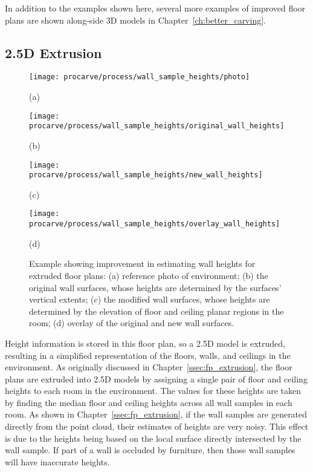 \documentclass[12pt,onecolumn,oneside]{book}
\begin{document}
In addition to the examples shown here, several more examples of improved floor plans are shown along-side 3D models in Chapter~\ref{ch:better_carving}.

\subsection{2.5D Extrusion}
\label{ssec:octree_fp_extrusion}

\begin{figure}

	\centering
	\begin{minipage}[t]{0.45\linewidth}
		\centerline{\texttt{[image: procarve/process/wall\_sample\_heights/photo]}}
		\centerline{(a)}
	\end{minipage}
	\hfill
	\begin{minipage}[t]{0.45\linewidth}
		\centerline{\texttt{[image: procarve/process/wall\_sample\_heights/original\_wall\_heights]}}
		\centerline{(b)}
	\end{minipage}
	
	\begin{minipage}[t]{0.45\linewidth}
		\centerline{\texttt{[image: procarve/process/wall\_sample\_heights/new\_wall\_heights]}}
		\centerline{(c)}
	\end{minipage}
	\hfill
	\begin{minipage}[t]{0.45\linewidth}
		\centerline{\texttt{[image: procarve/process/wall\_sample\_heights/overlay\_wall\_heights]}}
		\centerline{(d)}
	\end{minipage}

	\caption[Comparison of wall extrusion methods.]{Example showing improvement in estimating wall heights for extruded floor plans: (a) reference photo of environment; (b) the original wall surfaces, whose heights are determined by the surfaces' vertical extents; (c) the modified wall surfaces, whose heights are determined by the elevation of floor and ceiling planar regions in the room; (d) overlay of the original and new wall surfaces.}
	\label{fig:octree_wall_sample_heights}
\end{figure}

Height information is stored in this floor plan, so a 2.5D model is extruded, resulting in a simplified representation of the floors, walls, and ceilings in the environment.  As originally discussed in Chapter~\ref{ssec:fp_extrusion}, the floor plans are extruded into 2.5D models by assigning a single pair of floor and ceiling heights to each room in the environment.  The values for these heights are taken by finding the median floor and ceiling heights across all wall samples in each room.  As shown in Chapter~\ref{ssec:fp_extrusion}, if the wall samples are generated directly from the point cloud, their estimates of heights are very noisy.  This effect is due to the heights being based on the local surface directly intersected by the wall sample.  If part of a wall is occluded by furniture, then those wall samples will have inaccurate heights.
\end{document}
